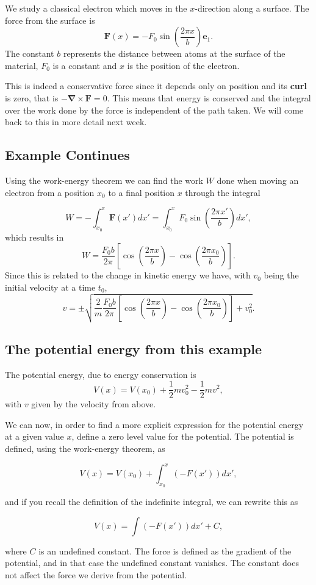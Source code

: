 \documentclass[%
oneside,                 %
final,                   %
10pt]{article}
\begin{document}
We study a classical electron which moves in the $x$-direction along a surface. The force from the surface is
\[
\bm{F}(x)=-F_0\sin{(\frac{2\pi x}{b})}\bm{e}_1.
\]
The constant $b$ represents the distance between atoms at the surface of the material, $F_0$ is a constant and $x$ is the position of the electron.

This is indeed a conservative force since it depends only on position
and its \textbf{curl} is zero, that is $-\bm{\nabla}\times \bm{F}=0$. This means that energy is conserved and the
integral over the work done by the force is independent of the path
taken. We will come back to this in more detail next week.

\subsection*{Example Continues}

Using the work-energy theorem we can find the work $W$ done when
moving an electron from a position $x_0$ to a final position $x$
through the integral

\[
W=-\int_{x_0}^x \bm{F}(x')dx' =  \int_{x_0}^x F_0\sin{(\frac{2\pi x'}{b})} dx',
\]
which results in
\[
W=\frac{F_0b}{2\pi}\left[\cos{(\frac{2\pi x}{b})}-\cos{(\frac{2\pi x_0}{b})}\right].
\]
Since this is related to the change in kinetic energy we have, with $v_0$ being the initial velocity at a  time $t_0$,
\[
v  = \pm\sqrt{\frac{2}{m}\frac{F_0b}{2\pi}\left[\cos{(\frac{2\pi x}{b})}-\cos{(\frac{2\pi x_0}{b})}\right]+v_0^2}.
\]

\subsection*{The potential energy from this example}

The potential energy, due to energy conservation is
\[
V(x)=V(x_0)+\frac{1}{2}mv_0^2-\frac{1}{2}mv^2,
\]
with $v$ given by the velocity from above.

We can now, in order to find a more explicit expression for the
potential energy at a given value $x$, define a zero level value for
the potential. The potential is defined, using the work-energy
theorem, as

\[
V(x)=V(x_0)+\int_{x_0}^x (-F(x'))dx',
\]

and if you recall the definition of the indefinite integral, we can rewrite this as

\[
V(x)=\int (-F(x'))dx'+C,
\]

where $C$ is an undefined constant. The force is defined as the
gradient of the potential, and in that case the undefined constant
vanishes. The constant does not affect the force we derive from the
potential.
\end{document}
